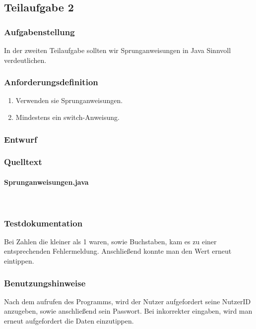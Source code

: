 \subsection{Teilaufgabe 2}
\subsubsection{Aufgabenstellung}
In der zweiten Teilaufgabe sollten wir Sprunganweisungen in Java Sinnvoll verdeutlichen.

\subsubsection{Anforderungsdefinition}
\begin{enumerate}
	\item Verwenden sie Sprunganweisungen.
	\item Mindestens ein switch-Anweisung.
\end{enumerate}

\subsubsection{Entwurf}
%

\subsubsection{Quelltext}
\paragraph{Sprunganweisungen.java}\


\subsubsection{Testdokumentation}
Bei Zahlen die kleiner als 1 waren, sowie Buchstaben, kam es zu einer entsprechenden Fehlermeldung. Anschließend konnte man den Wert erneut eintippen.

\subsubsection{Benutzungshinweise}
Nach dem aufrufen des Programms, wird der Nutzer aufgefordert seine NutzerID anzugeben,
sowie anschlie\ss end sein Passwort. Bei inkorrekter eingaben, wird man erneut aufgefordert
die Daten einzutippen.

